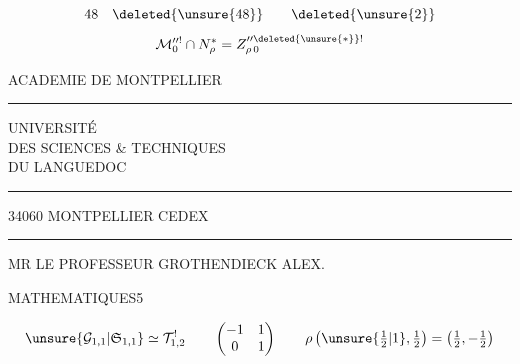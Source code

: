 
\[
48\quad\deleted{\unsure{48}}\qquad\deleted{\unsure{2}}
\]
\[
\mathcal M_0^{\prime\prime!}\cap N_\rho^*=Z_{\rho\,0}^{\prime\prime\deleted{\unsure{*}}!}
\]


\begin{center}
ACADEMIE DE MONTPELLIER\\
\rule{2cm}{0.4pt}

UNIVERSITÉ\\
DES SCIENCES \& TECHNIQUES\\
DU LANGUEDOC\\
\rule{2cm}{0.4pt}

34060 MONTPELLIER CEDEX\\
\rule{2cm}{0.4pt}
\end{center}

MR LE PROFESSEUR GROTHENDIECK ALEX.

MATHEMATIQUES\hfill 5



\[
\unsure{\mathcal G_{1,1}|\mathfrak S_{1,1}}\simeq\mathcal T_{1,2}^{!}
\qquad
\begin{pmatrix}-1&1\\0&1\end{pmatrix}
\qquad
\rho\left(\unsure{\tfrac12|1},\tfrac12\right)=\left(\tfrac12,-\tfrac12\right)
\]

